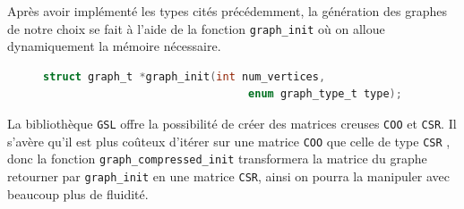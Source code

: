\documentclass[11pt]{article}
\begin{document}
\newline
Après avoir implémenté les types cités précédemment, la génération des graphes de notre choix se fait à l'aide de la fonction \texttt{graph\_init} où on alloue dynamiquement la mémoire nécessaire. 
\begin{figure}[h!]
    \begin{lstlisting}[language=C]
        struct graph_t *graph_init(int num_vertices,
                                enum graph_type_t type);
    \end{lstlisting}
\end{figure}
La bibliothèque \texttt{GSL} offre la possibilité de créer des matrices creuses \texttt{COO} et \texttt{CSR}. Il s'avère qu'il est plus coûteux d'itérer sur une matrice \texttt{COO} que celle de type \texttt{CSR} , donc la fonction \texttt{graph\_compressed\_init} transformera la matrice du graphe retourner par \texttt{graph\_init} en une matrice \texttt{CSR}, ainsi on pourra la manipuler avec beaucoup plus de fluidité.
\end{document}
